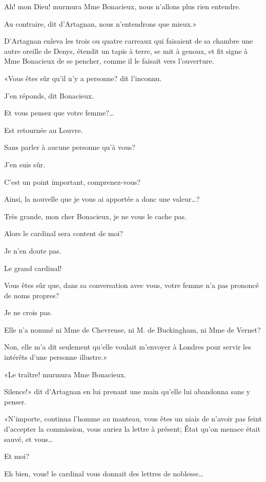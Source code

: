 \speak  Ah! mon Dieu! murmura Mme Bonacieux, nous n'allons plus rien entendre. 

\speak  Au contraire, dit d'Artagnan, nous n'entendrons que mieux.» 

D'Artagnan enleva les trois ou quatre carreaux qui faisaient de sa chambre une autre oreille de Denys, étendit un tapis à terre, se mit à genoux, et fit signe à Mme Bonacieux de se pencher, comme il le faisait vers l'ouverture. 

«Vous êtes sûr qu'il n'y a personne? dit l'inconnu. 

\speak  J'en réponds, dit Bonacieux. 

\speak  Et vous pensez que votre femme?\dots 

\speak  Est retournée au Louvre. 

\speak  Sans parler à aucune personne qu'à vous? 

\speak  J'en suis sûr. 

\speak  C'est un point important, comprenez-vous? 

\speak  Ainsi, la nouvelle que je vous ai apportée a donc une valeur\dots? 

\speak  Très grande, mon cher Bonacieux, je ne vous le cache pas. 

\speak  Alors le cardinal sera content de moi? 

\speak  Je n'en doute pas. 

\speak  Le grand cardinal! 

\speak  Vous êtes sûr que, dans sa conversation avec vous, votre femme n'a pas prononcé de noms propres? 

\speak  Je ne crois pas. 

\speak  Elle n'a nommé ni Mme de Chevreuse, ni M. de Buckingham, ni Mme de Vernet? 

\speak  Non, elle m'a dit seulement qu'elle voulait m'envoyer à Londres pour servir les intérêts d'une personne illustre.» 

«Le traître! murmura Mme Bonacieux. 

\speak  Silence!» dit d'Artagnan en lui prenant une main qu'elle lui abandonna sans y penser. 

«N'importe, continua l'homme au manteau, vous êtes un niais de n'avoir pas feint d'accepter la commission, vous auriez la lettre à présent; État qu'on menace était sauvé, et vous\dots 

\speak  Et moi? 

\speak  Eh bien, vous! le cardinal vous donnait des lettres de noblesse\dots 

